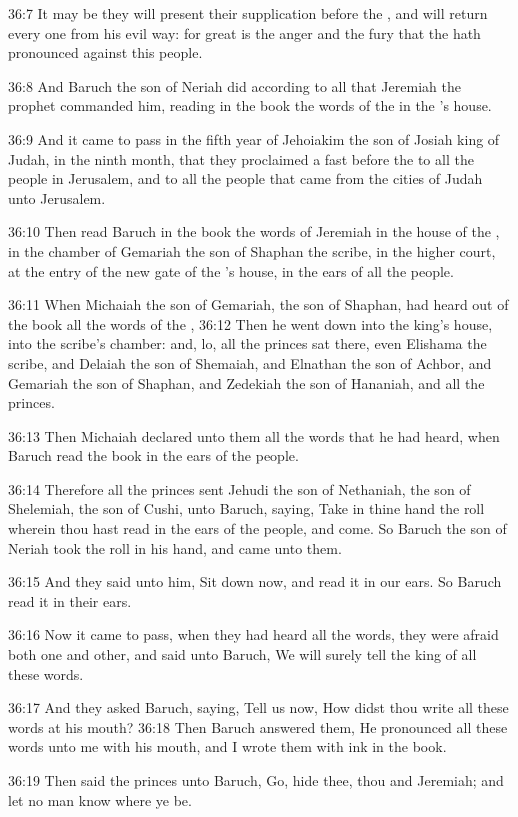 36:7 It may be they will present their supplication before the \LORD, and will return every one from his evil way: for great is the anger and the fury that the \LORD hath pronounced against this people.

36:8 And Baruch the son of Neriah did according to all that Jeremiah the prophet commanded him, reading in the book the words of the \LORD in the \LORD's house.

36:9 And it came to pass in the fifth year of Jehoiakim the son of Josiah king of Judah, in the ninth month, that they proclaimed a fast before the \LORD to all the people in Jerusalem, and to all the people that came from the cities of Judah unto Jerusalem.

36:10 Then read Baruch in the book the words of Jeremiah in the house of the \LORD, in the chamber of Gemariah the son of Shaphan the scribe, in the higher court, at the entry of the new gate of the \LORD's house, in the ears of all the people.

36:11 When Michaiah the son of Gemariah, the son of Shaphan, had heard out of the book all the words of the \LORD, 36:12 Then he went down into the king's house, into the scribe's chamber: and, lo, all the princes sat there, even Elishama the scribe, and Delaiah the son of Shemaiah, and Elnathan the son of Achbor, and Gemariah the son of Shaphan, and Zedekiah the son of Hananiah, and all the princes.

36:13 Then Michaiah declared unto them all the words that he had heard, when Baruch read the book in the ears of the people.

36:14 Therefore all the princes sent Jehudi the son of Nethaniah, the son of Shelemiah, the son of Cushi, unto Baruch, saying, Take in thine hand the roll wherein thou hast read in the ears of the people, and come. So Baruch the son of Neriah took the roll in his hand, and came unto them.

36:15 And they said unto him, Sit down now, and read it in our ears.  So Baruch read it in their ears.

36:16 Now it came to pass, when they had heard all the words, they were afraid both one and other, and said unto Baruch, We will surely tell the king of all these words.

36:17 And they asked Baruch, saying, Tell us now, How didst thou write all these words at his mouth?  36:18 Then Baruch answered them, He pronounced all these words unto me with his mouth, and I wrote them with ink in the book.

36:19 Then said the princes unto Baruch, Go, hide thee, thou and Jeremiah; and let no man know where ye be.

